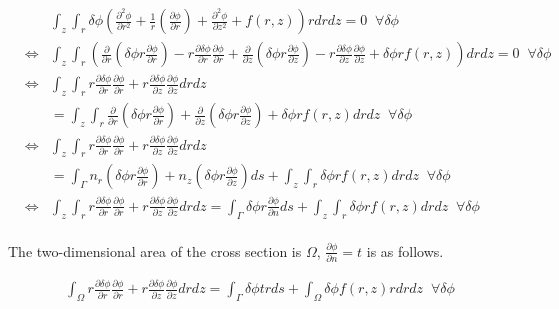 \begin{eqnarray}
&& \int_z\int_r \delta\phi\left(\frac{\partial^2\phi}{\partial r^2} + \frac{1}{r}\left(\frac{\partial\phi}{\partial r}\right) + \frac{\partial^2 \phi}{\partial z^2} + f(r,z)\right) r drdz = 0\;\;\forall \delta\phi\\
&\Leftrightarrow&         \int_z\int_r \left(\frac{\partial}{\partial r}\left(\delta\phi r\frac{\partial\phi}{\partial r}\right) - r\frac{\partial\delta\phi}{\partial r}\frac{\partial \phi}{\partial r} + \frac{\partial}{\partial z}\left(\delta\phi r\frac{\partial \phi}{\partial z}\right) - r\frac{\partial\delta\phi}{\partial z}\frac{\partial\phi}{\partial z} + \delta\phi rf(r,z)\right) drdz = 0\;\;\forall \delta\phi\\
&\Leftrightarrow&               \int_z\int_r   r\frac{\partial\delta\phi}{\partial r}\frac{\partial \phi}{\partial r} + r\frac{\partial\delta\phi}{\partial z}\frac{\partial\phi}{\partial z} drdz \\
&& = \int_z\int_r \frac{\partial}{\partial r}\left(\delta\phi r\frac{\partial\phi}{\partial r}\right) + \frac{\partial}{\partial z}\left(\delta\phi r\frac{\partial \phi}{\partial z}\right) + \delta\phi rf(r,z) drdz\;\;\forall \delta\phi\\
&\Leftrightarrow&               \int_z\int_r   r\frac{\partial\delta\phi}{\partial r}\frac{\partial \phi}{\partial r} + r\frac{\partial\delta\phi}{\partial z}\frac{\partial\phi}{\partial z} drdz\\
&& = \int_\Gamma n_r\left(\delta\phi r\frac{\partial\phi}{\partial r}\right) + n_z\left(\delta\phi r\frac{\partial \phi}{\partial z}\right)ds + \int_z\int_r \delta\phi rf(r,z) drdz\;\;\forall \delta\phi\\
&\Leftrightarrow&               \int_z\int_r   r\frac{\partial\delta\phi}{\partial r}\frac{\partial \phi}{\partial r} + r\frac{\partial\delta\phi}{\partial z}\frac{\partial\phi}{\partial z} drdz = \int_\Gamma \delta\phi r\frac{\partial\phi}{\partial n}ds + \int_z\int_r\delta\phi rf(r,z) drdz\;\;\forall \delta\phi\\
\end{eqnarray}

The two-dimensional area of ​​the cross section is $\Omega$, $\frac{\partial \phi}{\partial n}=t$ is as follows.

\begin{tcolorbox}[title=Laplace Equation in Cylindrical Coordinate in Weak Form]
\begin{eqnarray}
\int_\Omega r\frac{\partial\delta\phi}{\partial r}\frac{\partial \phi}{\partial r} + r\frac{\partial\delta\phi}{\partial z}\frac{\partial\phi}{\partial z} drdz = \int_\Gamma \delta\phi t rds + \int_\Omega\delta\phi f(r,z) rdrdz\;\;\forall \delta\phi\\
\end{eqnarray}
\end{tcolorbox}



